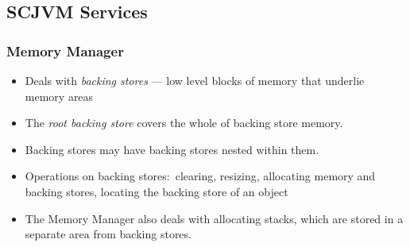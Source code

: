 \documentclass{beamer}
\begin{document}
\subsection{SCJVM Services}

\begin{frame}
  \frametitle{Memory Manager}
  \begin{itemize}
  \item Deals with \emph{backing stores} --- low level blocks of
    memory that underlie memory areas
  \item The \emph{root
      backing store} covers the whole of backing store memory.
  \item Backing stores may have backing stores nested within them.
  \item Operations on backing stores:~clearing, resizing, allocating
    memory and backing stores, locating the backing store of an object
  \item The Memory Manager also deals with allocating stacks, which
    are stored in a separate area from backing stores.
  \end{itemize}
\end{frame}
\end{document}
